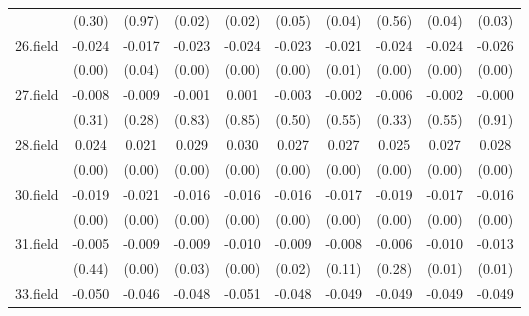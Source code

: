 {\begin{tabular}{l*{9}{c}}
          &   (0.30)         &   (0.97)         &   (0.02)         &   (0.02)         &   (0.05)         &   (0.04)         &   (0.56)         &   (0.04)         &   (0.03)         \\
[1em]
26.field  &   -0.024\sym{***}&   -0.017\sym{*}  &   -0.023\sym{***}&   -0.024\sym{***}&   -0.023\sym{***}&   -0.021\sym{**} &   -0.024\sym{***}&   -0.024\sym{***}&   -0.026\sym{***}\\
          &   (0.00)         &   (0.04)         &   (0.00)         &   (0.00)         &   (0.00)         &   (0.01)         &   (0.00)         &   (0.00)         &   (0.00)         \\
[1em]
27.field  &   -0.008         &   -0.009         &   -0.001         &    0.001         &   -0.003         &   -0.002         &   -0.006         &   -0.002         &   -0.000         \\
          &   (0.31)         &   (0.28)         &   (0.83)         &   (0.85)         &   (0.50)         &   (0.55)         &   (0.33)         &   (0.55)         &   (0.91)         \\
[1em]
28.field  &    0.024\sym{***}&    0.021\sym{**} &    0.029\sym{***}&    0.030\sym{***}&    0.027\sym{***}&    0.027\sym{***}&    0.025\sym{***}&    0.027\sym{***}&    0.028\sym{***}\\
          &   (0.00)         &   (0.00)         &   (0.00)         &   (0.00)         &   (0.00)         &   (0.00)         &   (0.00)         &   (0.00)         &   (0.00)         \\
[1em]
30.field  &   -0.019\sym{***}&   -0.021\sym{***}&   -0.016\sym{***}&   -0.016\sym{***}&   -0.016\sym{***}&   -0.017\sym{***}&   -0.019\sym{***}&   -0.017\sym{***}&   -0.016\sym{***}\\
          &   (0.00)         &   (0.00)         &   (0.00)         &   (0.00)         &   (0.00)         &   (0.00)         &   (0.00)         &   (0.00)         &   (0.00)         \\
[1em]
31.field  &   -0.005         &   -0.009\sym{**} &   -0.009\sym{*}  &   -0.010\sym{**} &   -0.009\sym{*}  &   -0.008         &   -0.006         &   -0.010\sym{*}  &   -0.013\sym{**} \\
          &   (0.44)         &   (0.00)         &   (0.03)         &   (0.00)         &   (0.02)         &   (0.11)         &   (0.28)         &   (0.01)         &   (0.01)         \\
[1em]
33.field  &   -0.050\sym{***}&   -0.046\sym{***}&   -0.048\sym{***}&   -0.051\sym{***}&   -0.048\sym{***}&   -0.049\sym{***}&   -0.049\sym{***}&   -0.049\sym{***}&   -0.049\sym{***}\\

\end{tabular}}
